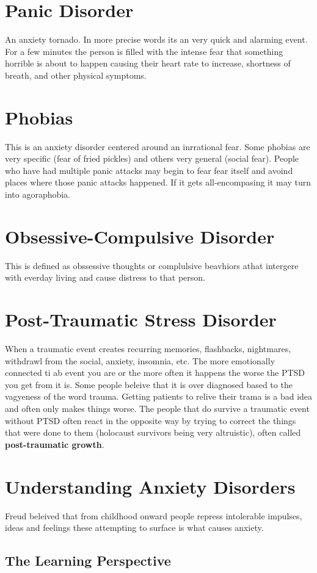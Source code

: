 \documentclass[12pt]{article}
\begin{document}
\section*{Panic Disorder}
An anxiety tornado. In more precise words its an very quick and alarming event. For a few minutes the person is filled with the intense fear that something horrible is about to happen causing their heart rate to increase, shortness of breath, and other physical symptoms. 
\section*{Phobias}
This is an anxiety disorder centered around an inrrational fear. Some phobias are very specific (fear of fried pickles) and others very general (social fear). People who have had multiple panic attacks may begin to fear fear itself and avoind places where those panic attacks happened. If it gets all-encompasing it may turn into agoraphobia. 
\section*{Obsessive-Compulsive Disorder}
This is defined as obssessive thoughts or complulsive beavhiors athat intergere with everday living and cause distress to that person.
\section*{Post-Traumatic Stress Disorder}
When a traumatic event creates recurring memories, flashbacks, nightmares, withdrawl from the social, anxiety, insomnia, etc. The more emotionally connected ti ab event you are or the more often it happens the worse the PTSD you get from it is. Some people beleive that it is over diagnosed based to the vagyeness of the word trauma. Getting patients to relive their trama is a bad idea and often only makes things worse. The people that do survive a traumatic event without PTSD often react in the opposite way by trying to correct the things that were done to them (holocaust survivors being very altruistic), often called \textbf{post-traumatic growth}.
\section*{Understanding Anxiety Disorders}
Freud beleived that from childhood onward people repress intolerable impulses, ideas and feelings these attempting to surface is what causes anxiety.
\subsection*{The Learning Perspective}
\end{document}
